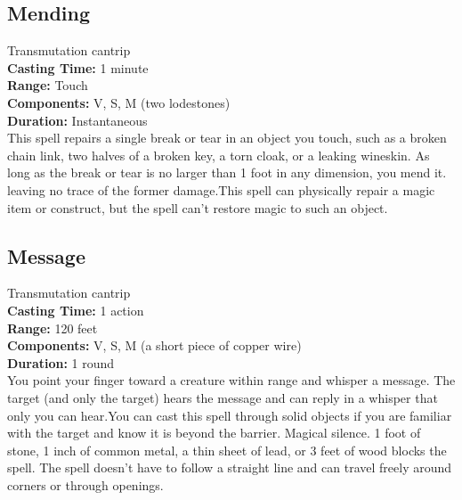 \documentclass[11pt, A4paper, english]{article}
\begin{document}
		\subsection{Mending}
Transmutation cantrip \\
\textbf{Casting Time:} 1 minute \\
\textbf{Range:} Touch \\
\textbf{Components:} V, S, M (two lodestones) \\
\textbf{Duration:} Instantaneous \\
This spell repairs a single break or tear in an object you touch, such as a broken chain link, two halves of a broken key, a torn cloak, or a leaking wineskin. As long as the break or tear is no larger than  1  foot in any dimension, you mend it. leaving no trace of the former damage.This spell can physically repair a magic item or construct, but the spell can’t restore magic to such an object.

		\subsection{Message}
Transmutation cantrip \\
\textbf{Casting Time:} 1 action \\
\textbf{Range:} 120 feet \\
\textbf{Components:} V, S, M (a short piece of copper wire) \\
\textbf{Duration:} 1 round \\
You point your finger toward a creature within range and whisper a message. The target (and only the target) hears the message and can reply in a whisper that only you can hear.You can cast this spell through solid objects if you are familiar with the target and know it is beyond the barrier. Magical silence.  1  foot of stone,  1  inch of common metal, a thin sheet of lead, or 3 feet of wood blocks the spell. The spell doesn’t have to follow a straight line and can travel freely around corners or through openings.
\end{document}
